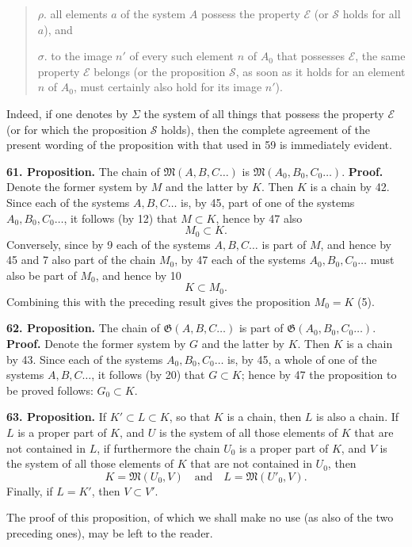 \documentclass[11pt]{article}
\newcommand{\Mf}{\mathfrak{M}}
\newcommand{\Gf}{\mathfrak{G}}
\newcommand{\partof}{\mathrel{\subset}}
\begin{document}
\begin{quote}
\(\rho.\) all elements \(a\) of the system \(A\) possess the property \(\mathcal E\) (or \(\mathcal S\) holds for all \(a\)), and

\(\sigma.\) to the image \(n'\) of every such element \(n\) of \(A_0\) that possesses \(\mathcal E\), the same property \(\mathcal E\) belongs (or the proposition \(\mathcal S\), as soon as it holds for an element \(n\) of \(A_0\), must certainly also hold for its image \(n'\)).
\end{quote}

Indeed, if one denotes by $\Sigma$ the system of all things that possess the property $\mathcal E$ (or for which the proposition $\mathcal S$ holds), then the complete agreement of the present wording of the proposition with that used in 59 is immediately evident.

\noindent\textbf{61. Proposition.} The chain of $\Mf(A,B,C\ldots)$ is $\Mf(A_0,B_0,C_0\ldots)$. \textbf{Proof.} Denote the former system by $M$ and the latter by $K$. Then $K$ is a chain by 42. Since each of the systems $A,B,C\ldots$ is, by 45, part of one of the systems $A_0,B_0,C_0\ldots$, it follows (by 12) that $M\partof K$, hence by 47 also
\[
M_0\partof K.
\]
Conversely, since by 9 each of the systems $A,B,C\ldots$ is part of $M$, and hence by 45 and 7 also part of the chain $M_0$, by 47 each of the systems $A_0,B_0,C_0\ldots$ must also be part of $M_0$, and hence by 10
\[
K\partof M_0.
\]
Combining this with the preceding result gives the proposition $M_0=K$ (5).

\noindent\textbf{62. Proposition.} The chain of $\Gf(A,B,C\ldots)$ is part of $\Gf(A_0,B_0,C_0\ldots)$. \textbf{Proof.} Denote the former system by $G$ and the latter by $K$. Then $K$ is a chain by 43. Since each of the systems $A_0,B_0,C_0\ldots$ is, by 45, a whole of one of the systems $A,B,C\ldots$, it follows (by 20) that $G\partof K$; hence by 47 the proposition to be proved follows: $G_0\partof K$.

\noindent\textbf{63. Proposition.} If $K'\partof L\partof K$, so that $K$ is a chain, then $L$ is also a chain. If $L$ is a proper part of $K$, and $U$ is the system of all those elements of $K$ that are not contained in $L$, if furthermore the chain $U_0$ is a proper part of $K$, and $V$ is the system of all those elements of $K$ that are not contained in $U_0$, then
\[
K=\Mf(U_0,V)\quad\text{and}\quad L=\Mf(U'_0,V).
\]
Finally, if $L=K'$, then $V\partof V'$.

The proof of this proposition, of which we shall make no use (as also of the two preceding ones), may be left to the reader.
\end{document}
